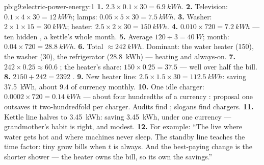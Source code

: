 \begin{solution}{pb:g9:electric-power-energy:1}
\textbf{1.} $2.3 \times 0.1 \times 30 = \qty{6.9}{kWh}$.
\textbf{2.} Television: $0.1 \times 4 \times 30 =
\qty{12}{kWh}$; lamps: $0.05 \times 5 \times 30 =
\qty{7.5}{kWh}$.
\textbf{3.} Washer: $2 \times 1 \times 15 = \qty{30}{kWh}$;
heater: $2.5 \times 2 \times 30 = \qty{150}{kWh}$.
\textbf{4.} $0.010 \times 720 = \qty{7.2}{kWh}$ --- ten
hidden , a kettle's whole month.
\textbf{5.} Average $120 \div 3 = \qty{40}{W}$; month:
$0.04 \times 720 = \qty{28.8}{kWh}$.
\textbf{6.} Total $\approx \qty{242}{kWh}$. Dominant: the
water heater (\qty{150}{}), the washer (\qty{30}{}), the
refrigerator (\qty{28.8}{kWh}) --- heating and always-on.
\textbf{7.} $242 \times 0.25 \approx 60.6$ ; the
heater's share: $150 \times 0.25 = 37.5$ --- well over
half the bill.
\textbf{8.} $2150 + 242 = 2392$ .
\textbf{9.} New heater line: $2.5 \times 1.5 \times 30 =
\qty{112.5}{kWh}$: saving \qty{37.5}{kWh}, about $9.4$
 of currency monthly.
\textbf{10.} One idle charger: $0.0002 \times 720 =
\qty{0.14}{kWh}$ --- about four hundredths of a currency
: proposal one outsaves it two-hundredfold per
charger. Audits find ; slogans find chargers.
\textbf{11.} Kettle line halves to \qty{3.45}{kWh}: saving
\qty{3.45}{kWh}, under one currency  --- grandmother's
habit is right, and modest.
\textbf{12.} For example: ``The  live where
water gets hot and where machines never sleep. The standby
line teaches the time factor: tiny  grow bills when
$t$ is always. And the best-paying change is the shorter
shower --- the heater owns the bill, so its  own the
savings.''
\end{solution}
